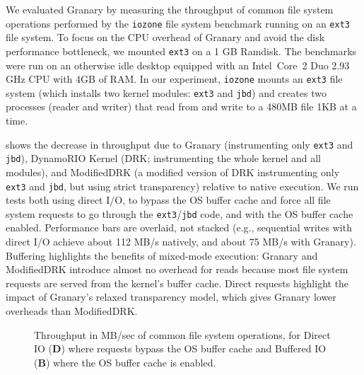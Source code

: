 \documentclass[preprint]{sigplanconf}
\begin{document}
We evaluated Granary by measuring the throughput of common file system operations performed by the \texttt{iozone} file system benchmark running on an \texttt{ext3} file system.
To focus on the CPU overhead of Granary and avoid the disk performance bottleneck, we mounted \texttt{ext3} on a 1 GB Ramdisk.  The benchmarks were run on an otherwise idle desktop equipped with an Intel\textregistered\ Core\texttrademark\ 2 Duo 2.93 GHz CPU with 4GB of RAM.  In our experiment, \texttt{iozone} mounts an \texttt{ext3} file system (which installs two kernel modules: \texttt{ext3} and \texttt{jbd}) and creates two processes (reader and writer) that read from and write to a 480MB file 1KB at a time. 
 

 shows the decrease in throughput due to Granary (instrumenting only \texttt{ext3} and \texttt{jbd}), DynamoRIO Kernel (DRK; instrumenting the whole kernel and all modules), and ModifiedDRK (a modified version of DRK instrumenting only \texttt{ext3} and \texttt{jbd}, but using strict transparency) relative to native execution.  We run tests both using direct I/O, to bypass the OS buffer cache and force all file system requests to go through the \texttt{ext3}/\texttt{jbd} code, and with the OS buffer cache enabled.  Performance bars are overlaid, not stacked (e.g., sequential writes with direct I/O achieve about 112 MB/s natively, and about 75 MB/s with Granary).  Buffering highlights the benefits of mixed-mode execution: Granary and ModifiedDRK introduce almost no overhead for reads because most file system requests are served from the kernel's buffer cache. Direct requests highlight the impact of Granary's relaxed transparency model, which gives Granary lower overheads than ModifiedDRK.

\begin{figure}[t!]
\vspace{-14pt}
\caption{\label{fig:perf}Throughput in MB/sec of common file system operations, for Direct IO (\textbf{D}) where requests bypass the OS buffer cache and Buffered IO (\textbf{B}) where the OS buffer cache is enabled. }
\end{figure}
\end{document}
